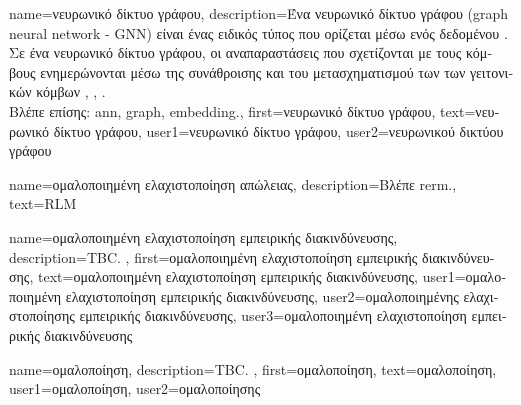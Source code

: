{name={\foreignlanguage{greek}{νευρωνικό δίκτυο γράφου}},
	description={\foreignlanguage{greek}{Ένα νευρωνικό δίκτυο γράφου} 
		(graph neural network - GNN) \foreignlanguage{greek}{είναι ένας ειδικός τύπος}  \foreignlanguage{greek}{που 
		ορίζεται μέσω ενός δεδομένου} . \foreignlanguage{greek}{Σε ένα νευρωνικό δίκτυο γράφου, 
		οι αναπαραστάσεις που σχετίζονται με τους κόμβους ενημερώνονται μέσω της συνάθροισης και του μετασχηματισμού 
		των}  \foreignlanguage{greek}{των γειτονικών κόμβων} 
		\cite{DeepLearningBishop}, \cite{GeometricDeepLearning2017}, \cite{SSLGCN}.
		\\
		\foreignlanguage{greek}{Βλέπε επίσης:} \gls{ann}, \gls{graph}, \gls{embedding}.},
	first={\foreignlanguage{greek}{νευρωνικό δίκτυο γράφου}},
	text={\foreignlanguage{greek}{νευρωνικό δίκτυο γράφου}},
	user1={\foreignlanguage{greek}{νευρωνικό δίκτυο γράφου}}, %
    	user2={\foreignlanguage{greek}{νευρωνικού δικτύου γράφου}} %
}

{name={\foreignlanguage{greek}{ομαλοποιημένη ελαχιστοποίηση απώλειας}},
 	description={\foreignlanguage{greek}{Βλέπε} \gls{rerm}.},
 	text={RLM}
}

{name={\foreignlanguage{greek}{ομαλοποιημένη ελαχιστοποίηση εμπειρικής διακινδύνευσης}}, 
	description={TBC. }, 
	first={\foreignlanguage{greek}{ομαλοποιημένη ελαχιστοποίηση εμπειρικής διακινδύνευσης}},
	text={\foreignlanguage{greek}{ομαλοποιημένη ελαχιστοποίηση εμπειρικής διακινδύνευσης}}, 
	user1={\foreignlanguage{greek}{ομαλοποιημένη ελαχιστοποίηση εμπειρικής διακινδύνευσης}}, %
  	user2={\foreignlanguage{greek}{ομαλοποιημένης ελαχιστοποίησης εμπειρικής διακινδύνευσης}}, %
	user3={\foreignlanguage{greek}{ομαλοποιημένη ελαχιστοποίηση εμπειρικής διακινδύνευσης}} %
}

{name={\foreignlanguage{greek}{ομαλοποίηση}}, 
	description={TBC. },
	first={\foreignlanguage{greek}{ομαλοποίηση}},
	text={\foreignlanguage{greek}{ομαλοποίηση}},
	user1={\foreignlanguage{greek}{ομαλοποίηση}}, %
	user2={\foreignlanguage{greek}{ομαλοποί\-ησης}} %
}


